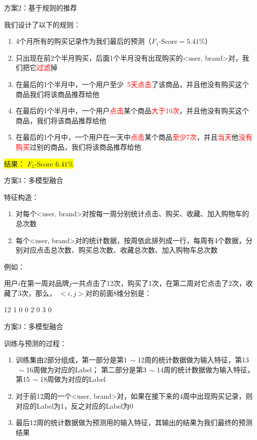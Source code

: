 \documentclass{beamer}
\begin{document}
\begin{frame}{方案2：基于规则的推荐}

我们设计了以下的规则：
\begin{enumerate}
\item 4个月所有的购买记录作为我们最后的预测（$F_1\mbox{-Score}=5.41\%$）
\item 只出现在前2个半月购买，后面1个半月没有出现购买的<user, brand>对，我们把它\textcolor{red}{过滤}掉
\item 在最后的1个半月中，一个用户至少\textcolor{red}{\,\,\,5天点击}了该商品，并且他没有购买这个商品我们将该商品推荐给他
\item 在最后的1个半月中，一个用户\textcolor{red}{点击}某个商品\textcolor{red}{大于10次}，并且他没有购买这个商品，我们将该商品推荐给他
\item 在最后的1个月中，一个用户在一天中\textcolor{red}{点击}某个商品\textcolor{red}{至少7次}，并且\textcolor{red}{当天}他\textcolor{red}{没有购买}过别的商品，我们将该商品推荐给他
\end{enumerate}

\colorbox{yellow}{结果： $F_1$-Score $6.41\%$}

\end{frame}

\begin{frame}{方案3：多模型融合}

特征构造：
\begin{enumerate}
\item 对每个<user, brand>对按每一周分别统计点击、购买、收藏、加入购物车的总次数
\item 每个<user, brand>对的统计数据，按周依此排列成一行，每周有4个数据，分别对应点击总次数、购买总次数、收藏总次数、加入购物车总次数
\end{enumerate}

\vspace{1em}

例如：

用户$i$在第一周对品牌$j$一共点击了12次，购买了1次，在第二周对它点击了2次，收藏了3次，那么，
$<i, j>$对的前面8维分别是：

12 1 0 0 2 0 3 0

\end{frame}

\begin{frame}{方案3：多模型融合}

训练与预测的过程：
\begin{enumerate}
\item 训练集由2部分组成，第一部分是第1$\,\sim$12周的统计数据做为输入特征，第13$\,\sim$16周做为对应的Label；
第二部分是第3$\,\sim$14周的统计数据做为输入特征，第15$\,\sim$18周做为对应的Label
\item 对于前12周的一个<user, brand>对，如果在接下来的4周中出现购买记录，则对应的Label为1，反之对应的Label为0
\item 最后12周的统计数据做为预测用的输入特征，其输出的结果为我们最终的预测结果
\end{enumerate}

\end{frame}
\end{document}
